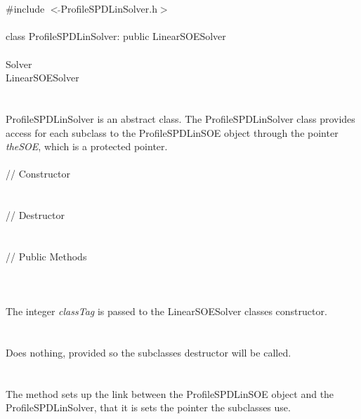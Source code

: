 
 \\

   \\
\indent \#include $<\tilde{ }$ProfileSPDLinSolver.h$>$  \\

  \\
\indent class ProfileSPDLinSolver: public LinearSOESolver  \\

 \\
\indent  Solver \\
\indent\indent LinearSOESolver \\
\indent\indent{} \\

  \\
\indent ProfileSPDLinSolver is an abstract class.  The ProfileSPDLinSolver
class provides access for each subclass to the ProfileSPDLinSOE object
through the pointer {\em theSOE}, which is a protected pointer. \\

  \\
\indent\indent // Constructor \\
\indent{}  \\ \\
\indent\indent // Destructor \\
\indent{}\\  \\
\indent\indent // Public Methods \\
\indent{} \\

  \\
  \\
The integer {\em classTag} is passed to the LinearSOESolver classes
constructor. \\ 

 \\
\\ 
Does nothing, provided so the subclasses destructor will be called. \\

  \\
 \\
The method sets up the link between the ProfileSPDLinSOE object and the
ProfileSPDLinSolver, that it is sets the pointer the subclasses use.  \\